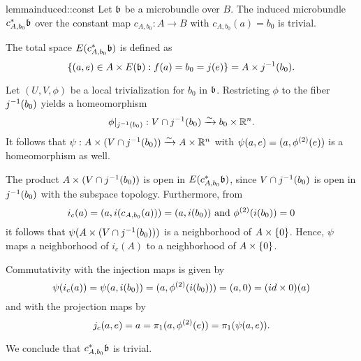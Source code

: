 \begin{mystatement}{lemma}{induced::const} Let $\bb$ be a microbundle over $B$. The induced microbundle $\ind{c_{A, b_0}}\bb$ over the constant map $c_{A, b_0}: A \to B$ with $c_{A, b_0}(a) = b_0$ is trivial. \end{mystatement}

\begin{myproof} The total space $E(\ind{c_{A, b_0}}\bb)$ is defined as \[ \set{(a, e) \in A \cross E(\bb)}{f(a) = b_0 = j(e)} = A \cross \inv{j}(b_0). \]

Let $(U, V, \phi)$ be a local trivialization for $b_0$ in $\bb$. Restricting $\phi$ to the fiber $j^{-1}(b_0)$ yields a homeomorphism \[ \phi\vert_{j^{-1}(b_0)}: V \cap j^{-1}(b_0) \xrightarrow{\sim} b_0 \times \mathbb{R}^n. \] It follows that $\psi: A \times (V \cap j^{-1}(b_0)) \xrightarrow{\sim} A \times \mathbb{R}^n$ with $\psi(a, e) = (a, \phi^{(2)}(e))$ is a homeomorphism as well.

The product $A \times (V \cap j^{-1}(b_0))$ is open in $E(\ind{c_{A, b_0}}\bb)$, since $V \cap j^{-1}(b_0)$ is open in $j^{-1}(b_0)$ with the subspace topology. Furthermore, from \[ i_{c}(a) = (a, i(c_{A, b_0}(a))) = (a, i(b_0)) \text{ and } \phi^{(2)}(i(b_0)) = 0 \] it follows that $\psi(A \times (V \cap j^{-1}(b_0)))$ is a neighborhood of $A \times{} \{0\}$. Hence, $\psi$ maps a neighborhood of $i_c(A)$ to a neighborhood of $A \times{} \{0\}$.

Commutativity with the injection maps is given by \[ \psi(i_c(a)) = \psi(a, i(b_0)) = (a, \phi^{(2)}(i(b_0))) = (a, 0) = (id \times 0)(a) \] and with the projection maps by \[ j_c(a, e) = a = \pi_1(a, \phi^{(2)}(e)) = \pi_1(\psi(a, e)). \]

We conclude that $\ind{c_{A, b_0}}\bb$ is trivial. \end{myproof}